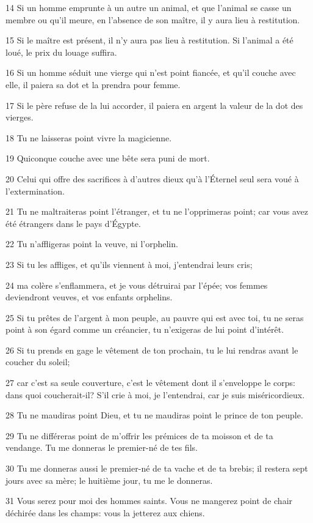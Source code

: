 \par 14 Si un homme emprunte à un autre un animal, et que l'animal se casse un membre ou qu'il meure, en l'absence de son maître, il y aura lieu à restitution.
\par 15 Si le maître est présent, il n'y aura pas lieu à restitution. Si l'animal a été loué, le prix du louage suffira.
\par 16 Si un homme séduit une vierge qui n'est point fiancée, et qu'il couche avec elle, il paiera sa dot et la prendra pour femme.
\par 17 Si le père refuse de la lui accorder, il paiera en argent la valeur de la dot des vierges.
\par 18 Tu ne laisseras point vivre la magicienne.
\par 19 Quiconque couche avec une bête sera puni de mort.
\par 20 Celui qui offre des sacrifices à d'autres dieux qu'à l'Éternel seul sera voué à l'extermination.
\par 21 Tu ne maltraiteras point l'étranger, et tu ne l'opprimeras point; car vous avez été étrangers dans le pays d'Égypte.
\par 22 Tu n'affligeras point la veuve, ni l'orphelin.
\par 23 Si tu les affliges, et qu'ils viennent à moi, j'entendrai leurs cris;
\par 24 ma colère s'enflammera, et je vous détruirai par l'épée; vos femmes deviendront veuves, et vos enfants orphelins.
\par 25 Si tu prêtes de l'argent à mon peuple, au pauvre qui est avec toi, tu ne seras point à son égard comme un créancier, tu n'exigeras de lui point d'intérêt.
\par 26 Si tu prends en gage le vêtement de ton prochain, tu le lui rendras avant le coucher du soleil;
\par 27 car c'est sa seule couverture, c'est le vêtement dont il s'enveloppe le corps: dans quoi coucherait-il? S'il crie à moi, je l'entendrai, car je suis miséricordieux.
\par 28 Tu ne maudiras point Dieu, et tu ne maudiras point le prince de ton peuple.
\par 29 Tu ne différeras point de m'offrir les prémices de ta moisson et de ta vendange. Tu me donneras le premier-né de tes fils.
\par 30 Tu me donneras aussi le premier-né de ta vache et de ta brebis; il restera sept jours avec sa mère; le huitième jour, tu me le donneras.
\par 31 Vous serez pour moi des hommes saints. Vous ne mangerez point de chair déchirée dans les champs: vous la jetterez aux chiens.

